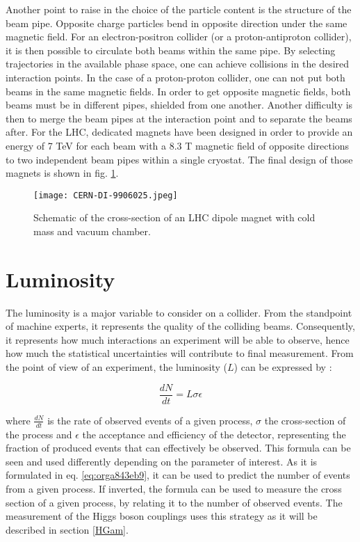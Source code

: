 Another point to raise in the choice of the particle content is the structure of the beam pipe.
Opposite charge particles bend in opposite direction under the same magnetic field.
For an electron-positron collider (or a proton-antiproton collider), it is then possible to circulate both beams within the same pipe.
By selecting trajectories in the available phase space, one can achieve collisions in the desired interaction points.
In the case of a proton-proton collider, one can not put both beams in the same magnetic fields.
In order to get opposite magnetic fields, both beams must be in different pipes, shielded from one another.
Another difficulty is then to merge the beam pipes at the interaction point and to separate the beams after.
For the LHC, dedicated magnets have been designed in order to provide an energy of 7 TeV for each beam with a 8.3 T magnetic field of opposite directions to two independent beam pipes within a single cryostat.
The final design of those magnets is shown in fig. \ref{fig:org5470cc3}.

\begin{figure}[htbp]
\centering
\texttt{[image: CERN-DI-9906025.jpeg]}
\caption{\label{fig:org5470cc3}
Schematic of the cross-section of an LHC dipole magnet with cold mass and vacuum chamber.\cite{CERN-DI-9906025}}
\end{figure}

\section{Luminosity}
\label{sec:orgdd48b5f}
\label{sec:Detector_luminosity}

The luminosity is a major variable to consider on a collider.
From the standpoint of machine experts, it represents the quality of the colliding beams.
Consequently, it represents how much interactions an experiment will be able to observe, hence how much the statistical uncertainties will contribute to final measurement.
From the point of view of an experiment, the luminosity (\(L\)) can be expressed by :

\begin{equation}
\label{eq:orga843eb9}
\frac{dN}{dt} = L\sigma\epsilon
\end{equation}

where \(\frac{dN}{dt}\) is the rate of observed events of a given process, \(\sigma\) the cross-section of the process and \(\epsilon\) the acceptance and efficiency of the detector, representing the fraction of produced events that can effectively be observed.
This formula can be seen and used differently depending on the parameter of interest.
As it is formulated in eq. \ref{eq:orga843eb9}, it can be used to predict the number of events from a given process.
If inverted, the formula can be used to measure the cross section of a given process, by relating it to the number of observed events.
The measurement of the Higgs boson couplings uses this strategy as it will be described in section \ref{HGam}.

